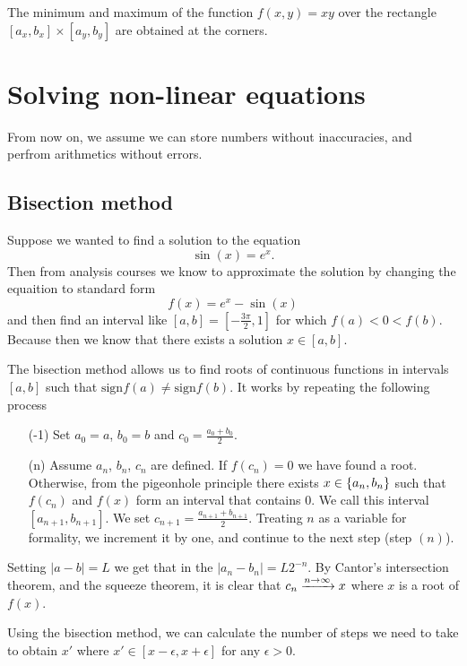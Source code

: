 \documentclass[11pt,a4paper]{article}
\begin{document}
\begin{proposition}
  The minimum and maximum of the function $f(x, y) = xy$ over
  the rectangle $[a_x, b_x] \times [a_y, b_y]$ are obtained at the corners. 
\end{proposition}

\section{Solving non-linear equations}
From now on, we assume we can store numbers without inaccuracies, and
perfrom arithmetics without errors.

\subsection{Bisection method}
Suppose we wanted to find a solution to the equation
\[
  \sin(x) = e^x.
\]
Then from analysis courses we know to approximate the solution by changing
the equaition to standard form
\[
  f(x) = e^x - \sin(x)
\]
and then find an interval like $[a, b] = [-\frac{3 \pi}{2}, 1]$ for which
$f(a) < 0 < f(b)$.
Because then we know that there exists a solution $x \in [a,b]$.

The bisection method allows us to find roots of continuous functions in
intervals $[a,b]$ such that $\mathrm{sign} f(a) \neq \mathrm{sign} f(b)$.
It works by repeating the following process
\begin{enumerate}
  \item[(-1)] Set $a_0 = a$, $b_0 = b$ and $c_0 = \frac{a_0 + b_0}{2}$.
  \item[(n)] Assume $a_n$, $b_n$, $c_n$ are defined. If $f(c_n) = 0$
    we have found a root. Otherwise, from the pigeonhole principle there
    exists $x \in \set{a_n,b_n}$ such that $f(c_n)$ and $f(x)$ form an interval
    that contains $0$. We call this interval $[a_{n + 1}, b_{n + 1}]$.
    We set $c_{n + 1} = \frac{a_{n + 1} + b_{n + 1}}{2}$. Treating $n$
    as a variable for formality, we increment it by one, and continue to
    the next step (step $(n)$).
\end{enumerate}
Setting $|a - b| = L$ we get that in the $|a_n - b_n| = L 2^{-n}$.
By Cantor's intersection theorem, and the squeeze theorem, it is clear
that $c_n \xrightarrow{n \to \infty} x$ where $x$ is a root of $f(x)$.

\begin{remark}
  Using the bisection method, we can calculate the number of steps we need to
  take to obtain $x'$ where $x' \in [x - \epsilon, x + \epsilon]$ for any
  $\epsilon > 0$.
\end{remark}
\end{document}
